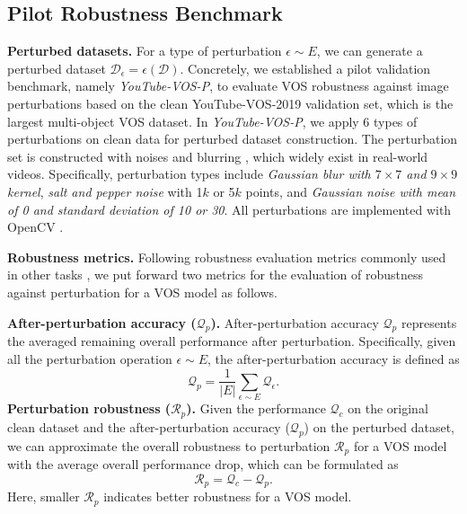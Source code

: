 \documentclass[sigconf]{acmart}
\begin{document}
\subsection{Pilot Robustness Benchmark}
\label{sec:robustness_benchmark}
\noindent\textbf{Perturbed datasets.}
For a type of perturbation ${\epsilon} \sim E$, we can generate a perturbed dataset $\mathcal{D}_{{\epsilon}}={\epsilon}(\mathcal{D})$. Concretely, we established a pilot validation benchmark, namely \textit{YouTube-VOS-P}, to evaluate VOS robustness against image perturbations based on the clean YouTube-VOS-2019 \cite{xu2018youtube} validation set, which is the largest multi-object VOS dataset. In \textit{YouTube-VOS-P}, we apply 6 types of perturbations on clean data for perturbed dataset construction. The perturbation set is constructed with noises \cite{deledalle2012compare} and blurring \cite{liu2020estimating}, which widely exist in real-world videos. Specifically, perturbation types include \textit{Gaussian blur with $7\times7$ and $9\times9$ kernel}, \textit{salt and pepper noise} with 1$k$ or 5$k$ points, and \textit{Gaussian noise with mean of 0 and standard deviation of 10 or 30}. All perturbations are implemented with OpenCV \cite{bradski2008learning}.

\noindent\textbf{Robustness metrics.} 
Following robustness evaluation metrics commonly used in other tasks \cite{hendrycks2019benchmarking,kamann2020benchmarking,laugros2019adversarial,tramer2019adversarial,jin2019bert}, we put forward two metrics for the evaluation of robustness against perturbation for a VOS model as follows.

\noindent\textbf{After-perturbation accuracy ($\mathcal{Q}_p$).} After-perturbation accuracy $\mathcal{Q}_p$ represents the averaged remaining overall performance after perturbation. Specifically, given all the perturbation operation ${\epsilon} \sim E$, the after-perturbation accuracy is defined as
\begin{equation}
  \mathcal{Q}_p = \frac{1}{|E|}\sum_{\epsilon \sim E}\mathcal{Q}_{{\epsilon}}.   
\end{equation}
\noindent\textbf{Perturbation robustness ($\mathcal{R}_p$).} Given the performance $\mathcal{Q}_c$ on the original clean dataset and the after-perturbation accuracy ($\mathcal{Q}_p$) on the perturbed dataset, we can approximate the overall robustness to perturbation $\mathcal{R}_p$ for a VOS model with the average overall performance drop, which can be formulated as 
\begin{equation}
\mathcal{R}_p = \mathcal{Q}_c-\mathcal{Q}_p. 
\end{equation}
Here, smaller $\mathcal{R}_p$ indicates better robustness for a VOS model. 
\end{document}
